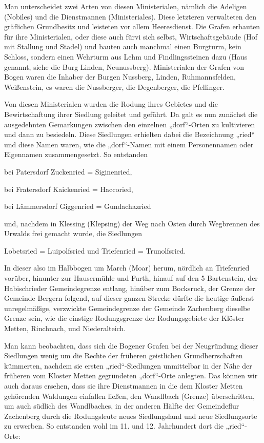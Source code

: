 \documentclass{book}
\begin{document}
Man unterscheidet zwei Arten von diesen Ministerialen, nämlich die Adeligen
(Nobiles) und die Dienstmannen (Ministeriales). Diese letzteren verwalteten den
gräflichen Grundbesitz und leisteten vor allem Heeresdienst. Die Grafen erbauten
für ihre Ministerialen, oder diese auch fürvi sich selbst, Wirtschaftsgebäude
(Hof mit Stallung und Stadel) und bauten auch manchmal einen Burgturm, kein
Schloss, sondern einen Wehrturm aus Lehm und Findlingssteinen dazu (Haus
genannt, siehe die Burg Linden, Neunussberg). Ministerialen der Grafen von Bogen
waren die Inhaber der Burgen Nussberg, Linden, Ruhmannsfelden, Weißenstein, es
waren die Nussberger, die Degenberger, die Pfellinger.

Von diesen Ministerialen wurden die Rodung ihres Gebietes und die
Bewirtschaftung ihrer Siedlung geleitet und geführt. Da galt es nun zunächst die
ausgedehnten Gemarkungen zwischen den einzelnen „dorf“-Orten zu kultivieren und
dann zu besiedeln. Diese Siedlungen erhielten dabei die Bezeichnung „ried“ und
diese Namen waren, wie die „dorf“-Namen mit einem Personennamen oder Eigennamen
zusammengesetzt. So entstanden

bei Patersdorf Zuckenried = Siginenried,

bei Fratersdorf Kaickenried = Haccoried,

bei Lämmersdorf Giggenried = Gundachazried

und, nachdem in Klessing (Klepsing) der Weg nach Osten durch Wegbrennen des
Urwalds frei gemacht wurde, die Siedlungen

Lobetsried = Luipolfsried und Triefenried = Trunolfsried.

In dieser also im Halbbogen um March (Moar) herum, nördlich an Triefenried
vorüber, hinunter zur Hausermühle und Furth, hinauf auf den 5 Bartenstein, der
Habischrieder Gemeindegrenze entlang, hinüber zum Bocksruck, der Grenze der
Gemeinde Bergern folgend, auf dieser ganzen Strecke dürfte die heutige äußerst
unregelmäßige, verzwickte Gemeindegrenze der Gemeinde Zachenberg dieselbe Grenze
sein, wie die einstige Rodungsgrenze der Rodungsgebiete der Klöster Metten,
Rinchnach, und Niederalteich.

Man kann beobachten, dass sich die Bogener Grafen bei der Neugründung dieser
Siedlungen wenig um die Rechte der früheren geistlichen Grundherrschaften
kümmerten, nachdem sie ersten „ried“-Siedlungen unmittelbar in der Nähe der
früheren vom Kloster Metten gegründeten „dorf“-Orte anlegten. Das können wir
auch daraus ersehen, dass sie ihre Dienstmannen in die dem Kloster Metten
gehörenden Waldungen einfallen ließen, den Wandlbach (Grenze) überschritten, um
auch südlich des Wandlbaches, in der anderen Hälfte der Gemeindeflur Zachenberg
durch die Rodungsleute neues Siedlungsland und neue Siedlungsorte zu erwerben.
So entstanden wohl im 11. und 12. Jahrhundert dort die „ried“-Orte:
\end{document}
